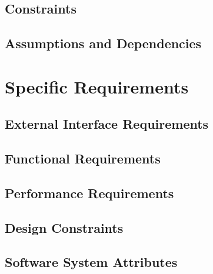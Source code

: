 \documentclass[12pt, a4paper]{article}
\begin{document}
	\subsection{Constraints}
	\subsection{Assumptions and Dependencies}

\section{Specific Requirements}
	\subsection{External Interface Requirements}
	\subsection{Functional Requirements}
	\subsection{Performance Requirements}
	\subsection{Design Constraints}
	\subsection{Software System Attributes}
\end{document}
